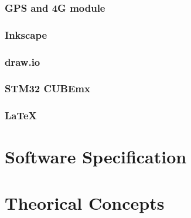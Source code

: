 \subsubsection{GPS and 4G module}
\subsubsection{Inkscape}
\subsubsection{draw.io}
\subsubsection{STM32 CUBEmx}
\subsubsection{\LaTeX}
\section{Software Specification}
\section{Theorical Concepts}